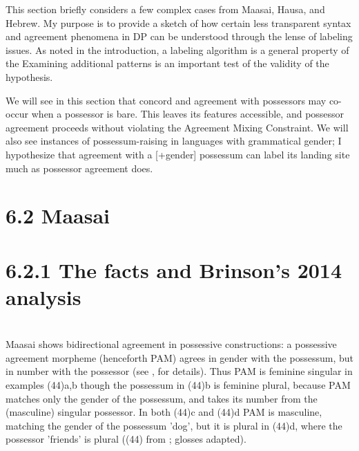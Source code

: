 \documentclass[output=paper
,modfonts
,nonflat]{langsci/langscibook}
\begin{document}
This section briefly considers a few complex cases from Maasai, Hausa, and Hebrew. My purpose is to provide a sketch of how certain less transparent syntax and agreement phenomena in DP can be understood through the lense of labeling issues. As noted in the introduction, a labeling algorithm is a general property of the Examining additional patterns is an important test of the validity of the hypothesis.

We will see in this section that concord and agreement with possessors may co-occur when a possessor is bare. This leaves its features accessible, and possessor agreement proceeds without violating the Agreement Mixing Constraint. We will also see instances of possessum-raising in languages with grammatical gender; I hypothesize that agreement with a [+gender] possessum can label its landing site much as possessor agreement does.

\section{\rmfamily\bfseries} 
\section{\rmfamily\bfseries} 
\section{\rmfamily\bfseries} 
\section{\textbf{6.2      Maasai}}
\section{\textbf{6.2.1    The facts and Brinson's 2014 analysis}}
\section{\rmfamily\bfseries} 

Maasai shows bidirectional agreement in possessive constructions: a possessive agreement morpheme (henceforth PAM) agrees in gender with the possessum, but in number with the possessor (see \citealt{Storto2003}, \citealt{Brinson2014} for details). Thus PAM is feminine singular in examples (44)a,b though the possessum in (44)b is feminine plural, because PAM matches only the gender of the possessum, and takes its number from the (masculine) singular possessor. In both (44)c and (44)d PAM  is masculine, matching the gender of the possessum 'dog', but it is plural in (44)d, where the possessor 'friends' is plural ((44) from \citealt{Brinson2014}; glosses adapted).
\end{document}
